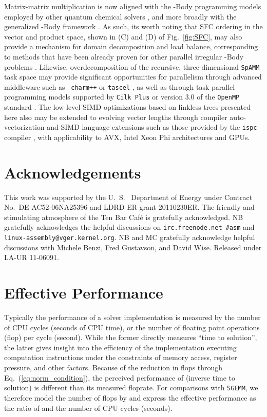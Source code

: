 Matrix-matrix multiplication is now aligned with the -Body programming
models employed by other quantum chemical solvers
\cite{Challacombe:1996:QCTCb, Challacombe:2000:HiCu, Challacombe:1996:QCTCa},
and more broadly with the generalized -Body framework
\cite{hernquist1988hierarchical, liu1994experiences, Gray:2001:NBody,
Gray:2003:NBody}.  As such, its worth noting that SFC ordering in the vector
and product space, shown in (C) and (D) of Fig.~\ref{fig:SFC}, may also
provide a mechanism for domain decomposition and load balance, corresponding
to methods that have been already proven for other parallel irregular -Body
problems \cite{Warren:1992:HOT, Warren:1995:HOTb, Aluru:1997:SFC,
Campbell:2003:SFC, Devine:2005:SFC}.  Likewise, overdecomposition of the
recursive, three-dimensional {\tt SpAMM} task space may provide significant
opportunities for parallelism through advanced middleware such as {\tt
charm++} \cite{CharmppPPWCPP96} or {\tt tascel} \cite{lifflander2012work,
ma2012data}, as well as through task parallel programming models supported by
{\tt Cilk Plus} \cite{cilkplus} or version 3.0 of the {\tt OpenMP} standard
\cite{openmp}.  The low level SIMD optimizations based on linkless trees
presented here also may be extended to evolving vector lengths through
compiler auto-vectorization and SIMD language extensions such as those
provided by the {\tt ispc} compiler \cite{ispc}, with applicability to AVX,
Intel Xeon Phi architectures and GPUs.

\section*{Acknowledgements}

This work was supported by the U.~S.~ Department of Energy under Contract
No.~DE-AC52-06NA25396 and LDRD-ER grant 20110230ER. The friendly and
stimulating atmosphere of the Ten Bar Caf\'{e} is gratefully acknowledged. NB
gratefully acknowledges the helpful discussions on {\tt irc.freenode.net
\#asm} and {\tt linux-assembly@vger.kernel.org}. NB and MC gratefully
acknowledge helpful discussions with Michele Benzi, Fred Gustavson, and David
Wise. Released under LA-UR 11-06091.

\appendix

\section{Effective Performance}
\label{sec:effective_performance}
Typically the performance of a solver implementation is measured by the number
of CPU cycles (seconds of CPU time), or the number of floating point
operations (flop) per cycle (second). While the former directly measures
``time to solution'', the latter gives insight into the efficiency of the
implementation executing computation instructions under the constraints of
memory access, register pressure, and other factors. Because of the reduction
in flops through Eq.~(\ref{eq:norm_condition}), the perceived performance of
\SpAMM{} (inverse time to solution) is different than its measured floprate.
For comparisons with {\tt SGEMM}, we therefore model the number of flops by  and express the effective performance as the
ratio of  and the number of CPU cycles (seconds).
